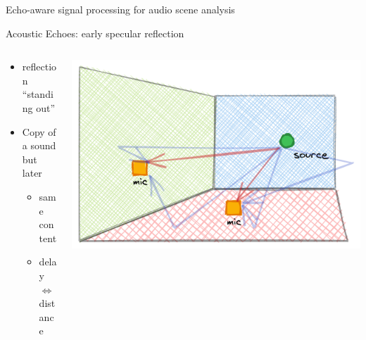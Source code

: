 \begin{frame}[t]{\alert{Echo-aware} signal processing for audio scene analysis}
    \pause

    \pause
    \begin{mydefblock}{Acoustic Echoes: early specular reflection}

        \vspace{-2mm}
        \begin{columns}[onlytextwidth]
            \begin{column}{0.58\textwidth}
                \begin{itemize}
                    \item reflection ``standing out''
                    \item Copy of a sound but later
                    \begin{itemize}
                        \item same content
                        \item delay $\Leftrightarrow$ distance
                    \end{itemize}
                \end{itemize}
            \end{column}
            \begin{column}{0.40\textwidth}
                \centering
                \includegraphics[width=\textwidth]{figures/echoes}
            \end{column}


\end{columns}
\end{mydefblock}
\end{frame}
